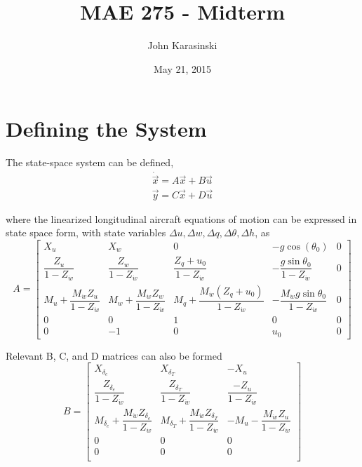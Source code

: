 \documentclass[11pt]{article}
\title{MAE 275 - Midterm}
\author{John Karasinski}
\date{May 21, 2015}
\begin{document}
\maketitle

\section{Defining the System}
The state-space system can be defined,
\begin{equation}
\begin{split}
\dot{\vec{x}} = A\vec{x} + B\vec{u} \\
      \vec{y} = C\vec{x} + D\vec{u}
\end{split}
\end{equation}

\noindent where the linearized longitudinal aircraft equations of motion can be expressed in state space form, with state variables $\Delta u, \Delta w, \Delta q, \Delta \theta, \Delta h$, as
\begin{equation*}
A =
\begin{bmatrix}
    X_u & X_w & 0 & -g \cos(\theta_0) & 0 \\
    \dfrac{Z_u}{1-Z_{\dot{w}}} & \dfrac{Z_w}{1-Z_{\dot{w}}} & \dfrac{Z_q + u_0}{1-Z_{\dot{w}}} & -\dfrac{g\sin \theta_0}{1-Z_{\dot{w}}} & 0 \\
    M_u + \dfrac{M_{\dot{w}} Z_u}{1-Z_{\dot{w}}} & M_w + \dfrac{M_{\dot{w}} Z_w}{1-Z_{\dot{w}}} & M_q + \dfrac{M_{\dot{w}} (Z_q + u_0)}{1-Z_{\dot{w}}} & -\dfrac{M_{\dot{w}} g\sin \theta_0}{1-Z_{\dot{w}}} & 0 \\
    0 & 0 & 1 & 0 & 0 \\
    0 & -1 & 0 & u_0 & 0
\end{bmatrix}
\end{equation*}

\noindent Relevant B, C, and D matrices can also be formed
\begin{equation*}
B =
\begin{bmatrix}
    X_{\delta_e}                                                   & X_{\delta_T}                                                   & -X_u                                          \\
    \dfrac{Z_{\delta_e}}{1-Z_{\dot{w}}}                            & \dfrac{Z_{\delta_T}}{1-Z_{\dot{w}}}                            & \dfrac{-Z_u}{1-Z_{\dot{w}}}                   \\
    M_{\delta_e} + \dfrac{M_{\dot{w}} Z_{\delta_e}}{1-Z_{\dot{w}}} & M_{\delta_T} + \dfrac{M_{\dot{w}} Z_{\delta_T}}{1-Z_{\dot{w}}} & -M_u - \dfrac{M_{\dot{w}} Z_u}{1-Z_{\dot{w}}} \\
    0   &  0   &  0 \\
    0   &  0   &  0 \\
\end{bmatrix}
\end{equation*}
\end{document}
